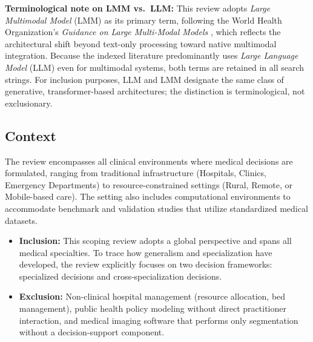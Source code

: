 \documentclass[review,12pt]{elsarticle}
\begin{document}
\noindent\textbf{Terminological note on LMM vs.\ LLM:} This review adopts \textit{Large Multimodal Model} (LMM) as its primary term, following the World Health Organization's \textit{Guidance on Large Multi-Modal Models} \cite{WHO2024LMM}, which reflects the architectural shift beyond text-only processing toward native multimodal integration. Because the indexed literature predominantly uses \textit{Large Language Model} (LLM) even for multimodal systems, both terms are retained in all search strings. For inclusion purposes, LLM and LMM designate the same class of generative, transformer-based architectures; the distinction is terminological, not exclusionary.

\subsection{Context} The review encompasses all clinical environments where medical decisions are formulated, ranging from traditional infrastructure (Hospitals, Clinics, Emergency Departments) to resource-constrained settings (Rural, Remote, or Mobile-based care).  The setting also includes computational environments to accommodate benchmark and validation studies that utilize standardized medical datasets.

\begin{itemize}
    \item \textbf{Inclusion:}  This scoping review adopts a global perspective and spans all medical specialties. To trace how generalism and specialization have developed, the review explicitly focuses on two decision frameworks: specialized decisions and cross-specialization decisions.
    \item \textbf{Exclusion:} Non-clinical hospital management (resource allocation, bed management), public health policy modeling without direct practitioner interaction, and medical imaging software that performs only segmentation without a decision-support component.
\end{itemize}
\end{document}

